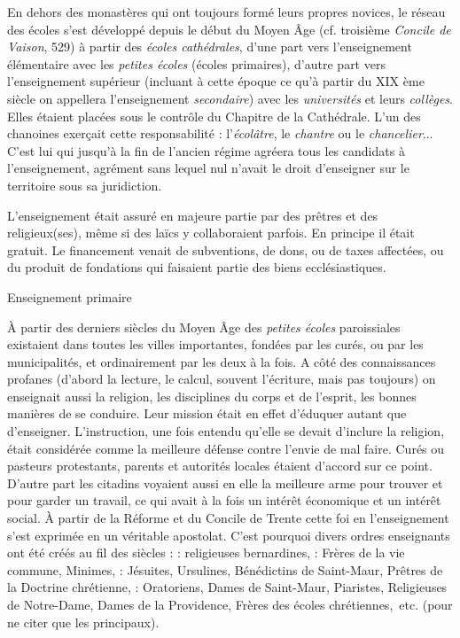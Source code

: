  
En dehors des monastères qui ont toujours formé leurs propres novices, le réseau des écoles s'est développé depuis le début du Moyen Âge (cf. troisième \emph{Concile de Vaison}, 529) à partir des \emph{écoles cathédrales}, d'une part vers l'enseignement élémentaire avec les \emph{petites écoles} (écoles primaires), d'autre part vers l'enseignement supérieur (incluant à cette époque ce qu'à partir du XIX ème siècle on appellera l'enseignement \emph{secondaire}) avec les \emph{universités} et leurs \emph{collèges}.  Elles étaient placées sous le contrôle du Chapitre de la Cathédrale. L'un des chanoines exerçait cette responsabilité : l'\emph{écolâtre},  le \emph{chantre} ou le \emph{chancelier}... C'est lui qui jusqu'à la fin de l'ancien régime agréera tous les candidats à l'enseignement, agrément sans lequel nul n'avait le droit d'enseigner sur le territoire sous sa juridiction.

L'enseignement était assuré en majeure partie par des prêtres et des religieux(ses), même si des laïcs y collaboraient parfois. En principe il était gratuit. Le financement venait de subventions, de dons, ou de taxes affectées, ou du produit de fondations qui faisaient partie des biens ecclésiastiques.

Enseignement primaire

À partir des derniers siècles du Moyen Âge des \emph{petites écoles} paroissiales existaient dans toutes les villes importantes, fondées par les curés, ou par les municipalités, et ordinairement par les deux à la fois. A côté des connaissances profanes (d'abord la lecture, le calcul, souvent l'écriture, mais pas toujours) on enseignait aussi la religion, les disciplines du corps et de l'esprit, les bonnes manières de se conduire. Leur mission était en effet d'éduquer autant que d'enseigner. L'instruction, une fois entendu qu'elle se devait d'inclure la religion, était considérée comme la meilleure défense contre l'envie de mal faire. Curés ou pasteurs protestants, parents et autorités locales étaient d'accord sur ce point. D'autre part les citadins voyaient aussi en elle la meilleure arme pour trouver et pour garder un travail, ce qui avait à la fois un intérêt économique et un intérêt social. À partir de la Réforme et du Concile de Trente cette foi en l'enseignement s'est exprimée en un véritable apostolat. C'est pourquoi divers ordres enseignants ont été créés au fil des siècles :
 : religieuses bernardines,
 : Frères de la vie commune, Minimes,
 : Jésuites, Ursulines, Bénédictins de Saint-Maur, Prêtres de la Doctrine chrétienne,
 : Oratoriens, Dames de Saint-Maur, Piaristes, Religieuses de Notre-Dame, Dames de la Providence, Frères des écoles chrétiennes,~etc. (pour ne citer que les principaux).

